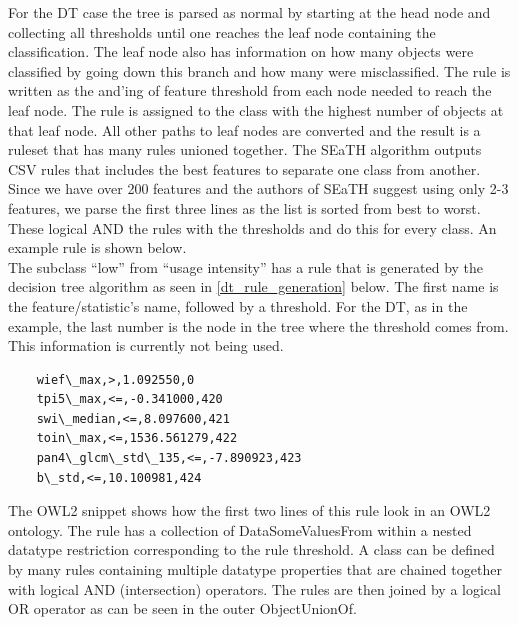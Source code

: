 \documentclass[authoryear, review,12pt,number]{elsarticle}
\begin{document}
For the DT case the tree is parsed as normal by starting at the head node and
collecting all thresholds until one reaches the leaf node containing the
classification. The leaf node also has information on how many objects were
classified by going down this branch and how many were misclassified. The rule
is written as the and'ing of feature threshold from each node needed to reach
the leaf node. The rule is assigned to the class with the highest number of
objects at that leaf node. All other paths to leaf nodes are converted and the
result is a ruleset that has many rules unioned together. The SEaTH algorithm
outputs CSV rules that includes the best features to separate one class from
another. Since we have over 200 features and the authors of SEaTH suggest using
only 2-3 features, we parse the first three lines as the list is sorted from
best to worst. These logical AND the rules with the thresholds and do this for
every class. An example rule is shown below.
\\%
The subclass ``low'' from ``usage intensity'' has a rule that is generated by
the decision tree algorithm as seen in \ref{dt_rule_generation} below. The first
name is the feature/statistic's name, followed by a threshold. For the DT, as in
the example, the last number is the node in the tree where the threshold comes
from. This information is currently not being used.
\label{dt_rule_snippet_csv}
\begin{lstlisting}
    wief\_max,>,1.092550,0
    tpi5\_max,<=,-0.341000,420
    swi\_median,<=,8.097600,421
    toin\_max,<=,1536.561279,422
    pan4\_glcm\_std\_135,<=,-7.890923,423
    b\_std,<=,10.100981,424
\end{lstlisting}
The OWL2 snippet shows how the first two lines of this rule look in an OWL2
ontology. The rule has a collection of DataSomeValuesFrom within a nested datatype
restriction corresponding to the rule threshold. A class can be defined by
many rules containing multiple datatype properties that are chained together
with logical AND (intersection) operators. The rules are then joined by a
logical OR operator as can be seen in the outer ObjectUnionOf.  
\label{dt_rule_snippet_owl}
\end{document}
